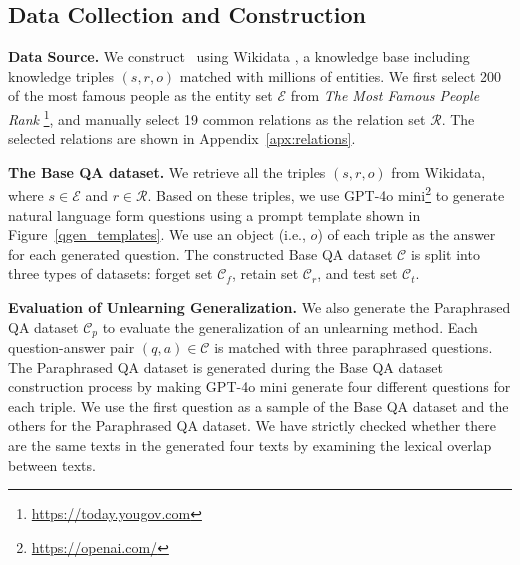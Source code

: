 \subsection{Data Collection and Construction}


\noindent\textbf{Data Source.} We construct \ourdata~using Wikidata \citep{vrandevcic2014wikidata}, a knowledge base including knowledge triples $(s,r,o)$ matched with millions of entities.
We first select 200 of the most famous people as the entity set $\mathcal{E}$ from \textit{The Most Famous People Rank} \footnote{\url{https://today.yougov.com}}, and manually select 19 common relations as the relation set $\mathcal{R}$. The selected relations are shown in Appendix~\ref{apx:relations}. 



\noindent\textbf{The Base QA dataset.}
We retrieve all the triples $(s,r,o)$ from Wikidata, where $s \in \mathcal{E}$ and $r \in \mathcal{R}$.
Based on these triples, we use GPT-4o mini\footnote{\url{https://openai.com/}} to generate natural language form questions using a prompt template shown in Figure~\ref{qgen_templates}.
We use an object (i.e., $o$) of each triple as the answer for each generated question.
The constructed Base QA dataset $\mathcal{C}$ is split into three types of datasets: forget set $\mathcal{C}_{f}$, retain set $\mathcal{C}_{r}$, and test set $\mathcal{C}_{t}$.

\noindent\textbf{Evaluation of Unlearning Generalization.}
We also generate the Paraphrased QA dataset $\mathcal{C}_{p}$ to evaluate the generalization of an unlearning method.
Each question-answer pair $(q,a) \in \mathcal{C}$ is matched with three paraphrased questions.
The Paraphrased QA dataset is generated during the Base QA dataset construction process by making GPT-4o mini generate four different questions for each triple.
We use the first question as a sample of the Base QA dataset and the others for the Paraphrased QA dataset.
We have strictly checked whether there are the same texts in the generated four texts by examining the lexical overlap between texts.


